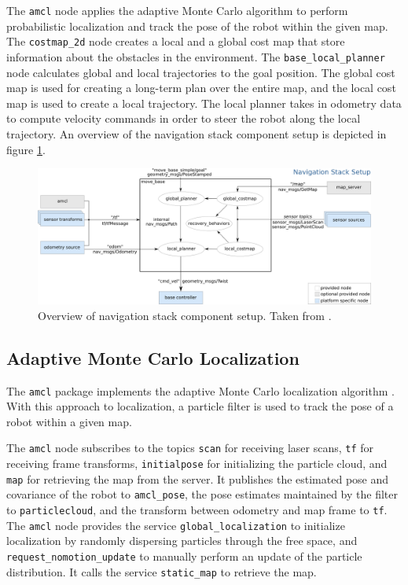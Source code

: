 \documentclass[10pt,journal,compsoc]{IEEEtran}
\begin{document}
The \texttt{amcl} node applies the adaptive Monte Carlo algorithm to perform probabilistic localization and track the pose of the robot within the given map. The \texttt{costmap\_2d} node creates a local and a global cost map that store information about the obstacles in the environment. The \texttt{base\_local\_planner} node calculates global and local trajectories to the goal position. The global cost map is used for creating a long-term plan over the entire map, and the local cost map is used to create a local trajectory. The local planner takes in odometry data to compute velocity commands in order to steer the robot along the local trajectory. An overview of the navigation stack component setup is depicted in figure \ref{fig:overview_navigation_stack}.
\begin{figure}[thpb]
      \centering
      \includegraphics[width=\textwidth]{images/overview_tf.png}
      \caption{Overview of navigation stack component setup. Taken from  \cite{ros_wiki_nav_stack}.}
      \label{fig:overview_navigation_stack}
\end{figure}

\subsection{Adaptive Monte Carlo Localization}
The \texttt{amcl} package implements the adaptive Monte Carlo localization algorithm \cite{ros_wiki_amcl}. With this approach to localization, a particle filter is used to track the pose of a robot within a given map.

The \texttt{amcl} node subscribes to the topics \texttt{scan} for receiving laser scans, \texttt{tf} for receiving frame transforms, \texttt{initialpose} for initializing the particle cloud, and \texttt{map} for retrieving the map from the server. It publishes the estimated pose and covariance of the robot to \texttt{amcl\_pose}, the pose estimates maintained by the filter to \texttt{particlecloud}, and the transform between odometry and map frame to \texttt{tf}. The \texttt{amcl} node provides the service \texttt{global\_localization} to initialize localization by randomly dispersing particles through the free space, and \texttt{request\_nomotion\_update} to manually perform an update of the particle distribution. It calls the service \texttt{static\_map} to retrieve the map.
\end{document}
